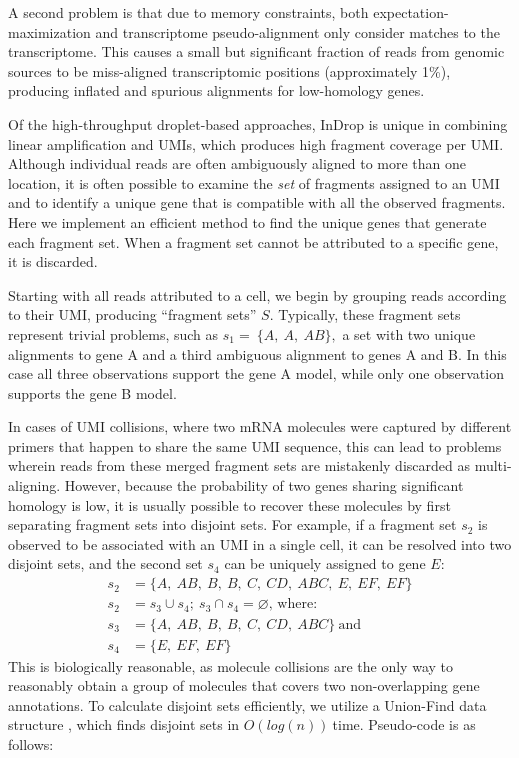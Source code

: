 A second problem is that due to memory constraints, both expectation-maximization and transcriptome pseudo-alignment only consider matches to the transcriptome. 
This causes a small but significant fraction of reads from genomic sources to be miss-aligned transcriptomic positions (approximately 1\%), producing inflated and spurious alignments for low-homology genes.

Of the high-throughput droplet-based approaches, InDrop is unique in combining linear amplification and UMIs, which produces high fragment coverage per UMI\@. 
Although individual reads are often ambiguously aligned to more than one location, it is often possible to examine the \textit{set} of fragments assigned to an UMI and to identify a unique gene that is compatible with all the observed fragments. 
Here we implement an efficient method to find the unique genes that generate each fragment set. 
When a fragment set cannot be attributed to a specific gene, it is discarded.

Starting with all reads attributed to a cell, we begin by grouping reads according to their UMI, producing ``fragment sets'' \(S\). 
Typically, these fragment sets represent trivial problems, such as \(s_{1} = \ \{ A,\ A,\ AB\},\) a set with two unique alignments to gene A and a third ambiguous alignment to genes A and B. 
In this case all three observations support the gene A model, while only one observation supports the gene B model.

In cases of UMI collisions, where two mRNA molecules were captured by different primers that happen to share the same UMI sequence, this can lead to problems wherein reads from these merged fragment sets are mistakenly discarded as multi-aligning. 
However, because the probability of two genes sharing significant homology is low, it is usually possible to recover these molecules by first separating fragment sets into disjoint sets. 
For example, if a fragment set $s_2$ is observed to be associated with an UMI in a single cell, it can be resolved into two disjoint sets, and the second set $s_4$ can be uniquely assigned to gene $E$: 
\begin{align*}
  s_{2} & = \{ A,\ AB,\ B,\ B,\ C,\ CD,\ ABC,\ E,\ EF,\ EF\} \\
  s_{2} & = s_{3} \cup s_{4};\ s_{3} \cap s_{4} = \varnothing \text{, where}: \\
  s_{3} & = \{ A,\ AB,\ B,\ B,\ C,\ CD,\ ABC\}\ \text{and} \\ 
  s_{4} & = \{ E,\ EF,\ EF\}
\end{align*}
This is biologically reasonable, as molecule collisions are the only way to reasonably obtain a group of molecules that covers two non-overlapping gene annotations.
To calculate disjoint sets efficiently, we utilize a Union-Find data structure \citep{Aho1983}, which finds disjoint sets in \(O(log(n))\ \)time. 
Pseudo-code is as follows:

